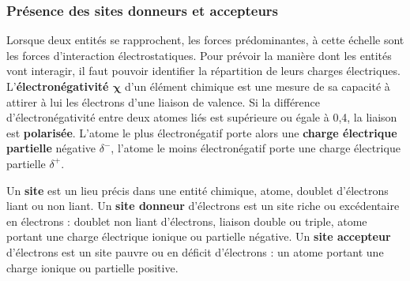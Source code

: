 \documentclass[a4paper,13pt,fleqn]{scrartcl}%
\begin{document}
        \subsubsection{Présence des sites donneurs et accepteurs}
Lorsque deux entités se rapprochent, les forces prédominantes, à cette échelle sont les forces d'interaction électrostatiques. Pour prévoir la manière dont les entités vont interagir, il faut pouvoir identifier la répartition de leurs charges électriques.\\
L'\textbf{électronégativité $\mathbf{\chi}$} d'un élément chimique est une mesure de sa capacité à attirer à lui les électrons d'une liaison de valence. Si la différence d'électronégativité entre deux atomes liés est supérieure ou égale à 0,4, la liaison est \textbf{polarisée}. L'atome le plus électronégatif porte alors une \textbf{charge électrique partielle} négative $\delta^-$, l'atome le moins électronégatif porte une charge électrique partielle $\delta^+$.\\

\begin{figure}[h!]
\centering
{}
\end{figure}
Un \textbf{site} est un lieu précis dans une entité chimique, atome, doublet d'électrons liant ou non liant. Un \textbf{site donneur} d'électrons est un site riche ou excédentaire en électrons : doublet non liant d'électrons, liaison double ou triple, atome portant une charge électrique ionique ou partielle négative. Un \textbf{site accepteur} d'électrons est un site pauvre ou en déficit d'électrons : un atome portant une charge ionique ou partielle positive.
\end{document}
